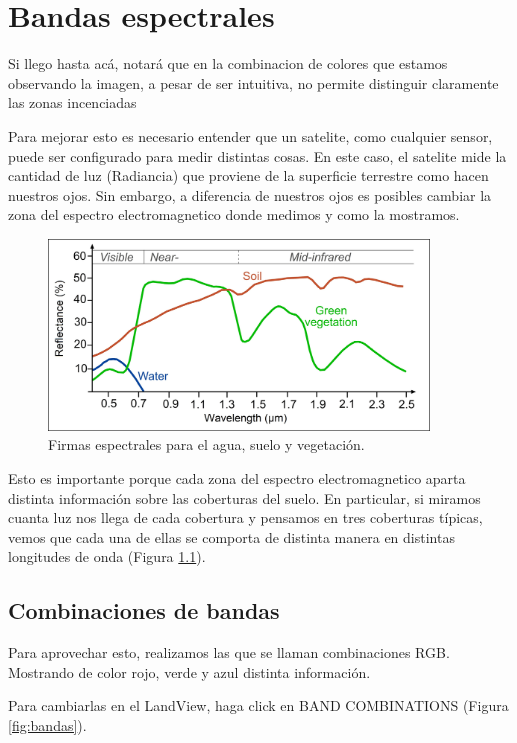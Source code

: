 \documentclass[a4paper,12pt]{book}
\begin{document}
\chapter{Bandas espectrales}
Si llego hasta acá, notará que en la combinacion de colores que estamos observando la imagen, a pesar de ser intuitiva, no permite distinguir claramente las zonas incenciadas

Para mejorar esto es necesario entender que un satelite, como cualquier sensor, puede ser configurado para medir distintas cosas. En este caso, el satelite mide la cantidad de luz (Radiancia) que proviene de la superficie terrestre como hacen nuestros ojos. Sin embargo, a diferencia de nuestros ojos es posibles cambiar la zona del espectro electromagnetico donde medimos y como la mostramos.

\begin{figure}[h!]
    \centering
    \includegraphics[width=0.9\textwidth]{fig:spec.jpg}
    \caption{Firmas espectrales para el agua, suelo y vegetación.}
    \label{fig:spec}
\end{figure}

Esto es importante porque cada zona del espectro electromagnetico aparta distinta información sobre las coberturas del suelo. En particular, si miramos cuanta luz nos llega de cada cobertura y pensamos en tres coberturas típicas, vemos que cada una de ellas se comporta de distinta manera en distintas longitudes de onda (Figura \ref{fig:spec}).

\section{Combinaciones de bandas}

Para aprovechar esto, realizamos las que se llaman combinaciones RGB. Mostrando de color rojo, verde y azul distinta información.

Para cambiarlas en el LandView, haga click en BAND COMBINATIONS (Figura \ref{fig:bandas}).
\end{document}
